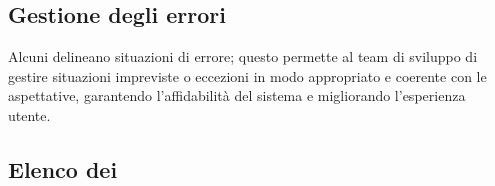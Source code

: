 \subsection{Gestione degli errori}
\par Alcuni  delineano situazioni di errore; questo permette al team di sviluppo di gestire situazioni impreviste o eccezioni in modo appropriato e coerente con le aspettative, garantendo l'affidabilità del sistema e migliorando l'esperienza utente.

\subsection{Elenco dei }













